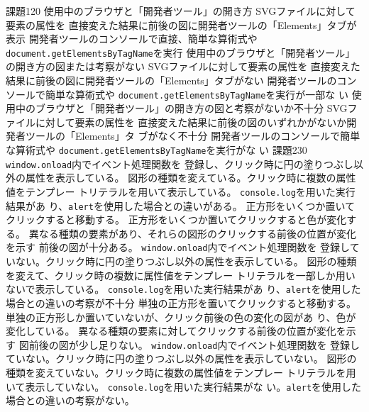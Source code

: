 \documentclass[a4j]{jreport}
\begin{document}
{{課題1}{20}
{
  {使用中のブラウザと「開発者ツール」の開き方\ResultFI}
  {SVGファイルに対して要素の属性を
  直接変えた結果に前後の図に開発者ツールの「Elements」タブが表示\ResultA}
  {開発者ツールのコンソールで直接、簡単な算術式や
  \texttt{document}\newline\texttt{.getElementsByTagName}を実行\ResultA}
}
{
  {使用中のブラウザと「開発者ツール」の開き方の図または考察がない\ResultFI}
  {SVGファイルに対して要素の属性を
  直接変えた結果に前後の図に開発者ツールの「Elements」タブがない\ResultA}
  {開発者ツールのコンソールで簡単な算術式や
  \texttt{document}\newline\texttt{.getElementsByTagName}を実行が一部な
  い\ResultA}
}
{
  {使用中のブラウザと「開発者ツール」の開き方の図と考察がないか不十分\ResultFI}
  {SVGファイルに対して要素の属性を
  直接変えた結果に前後の図のいずれかがないか開発者ツールの「Elements」タ
  ブがなく不十分\ResultA}
  {開発者ツールのコンソールで簡単な算術式や
  \texttt{document}\newline\texttt{.getElementsByTagName}を実行がな
  い\ResultA}
}
 {課題2}{30}
 {
 {\texttt{window.onload}内でイベント処理関数を
 登録し、クリック時に円の塗りつぶし以外の属性を表示している。\ResultA}
 {\Must 図形の種類を変えている。クリック時に複数の属性値をテンプレー
 トリテラルを用いて表示している。\ResultA}
 {\Must\texttt{console.log}を用いた実行結果があ
 り、\texttt{alert}を使用した場合との違いがある。 \ResultFI}
 {\Must 正方形をいくつか置いてクリックすると移動する。\ResultA}
 {正方形をいくつか置いてクリックすると色が変化する。\ResultA}
 {異なる種類の要素があり、それらの図形のクリックする前後の位置が変化を示す
 前後の図が十分ある。\ResultA}
 }
 {
 {\texttt{window.onload}内でイベント処理関数を
 登録していない。クリック時に円の塗りつぶし以外の属性を表示している。\ResultA}
 {\Must 図形の種類を変えて、クリック時の複数に属性値をテンプレー
 トリテラルを一部しか用いないで表示している。\ResultA}
 {\Must\texttt{console.log}を用いた実行結果があ
 り、\texttt{alert}を使用した場合との違いの考察が不十分 \ResultFI}
 {\Must 単独の正方形を置いてクリックすると移動する。\ResultA}
 {単独の正方形しか置いていないが、クリック前後の色の変化の図があ
 り、色が変化している。\ResultA}
 {異なる種類の要素に対してクリックする前後の位置が変化を示す
 図前後の図が少し足りない。\ResultA}
 }
 {
 {\texttt{window.onload}内でイベント処理関数を
 登録していない。クリック時に円の塗りつぶし以外の属性を表示していない。\ResultA}
 {\Must 図形の種類を変えていない。クリック時に複数の属性値をテンプレー
 トリテラルを用いて表示していない。\ResultA}
 {\Must\texttt{console.log}を用いた実行結果がな
 い。\texttt{alert}を使用した場合との違いの考察がない。 \ResultFI}
}}
\end{document}
